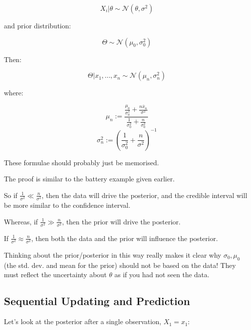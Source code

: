 \documentclass[a4paper]{article}
\begin{document}
                \[
                    X_i | \theta \sim \mathcal{N}(\theta, \sigma^2)
                \]

                and prior distribution:

                \[
                    \Theta \sim \mathcal{N}(\mu_0, \sigma_0^2)
                \]

                Then:

                \[
                    \Theta | x_1, ..., x_n \sim \mathcal{N}(\mu_n, \sigma^2_n)
                \]

                where:

                \[
                    \mu_n := \frac{\frac{\mu_0}{\sigma_0^2} + \frac{n\bar x_n}
                    {\sigma^2}}{\frac{1}{\sigma_0^2} + \frac{n}{\sigma_0^2}}
                \]
                \[
                    \sigma_n^2 := \left(\frac{1}{\sigma_0^2} +
                    \frac{n}{\sigma^2}\right)^{-1}
                \]

                These formulae should probably just be memorised.

                The proof is similar to the battery example given earlier.

                So if $\frac{1}{\sigma^2} \ll \frac{n}{\sigma^2}$, then the
                data will drive the posterior, and the credible interval will be
                more similar to the confidence interval.

                Whereas, if $\frac{1}{\sigma^2} \gg \frac{n}{\sigma^2}$, then
                the prior will drive the posterior.

                If $\frac{1}{\sigma^2} \approx \frac{n}{\sigma^2}$, then both
                the data and the prior will influence the posterior.

                \begin{warn}
                    Thinking about the prior/posterior in this way really makes
                    it clear why $\sigma_0, \mu_0$ (the std. dev. and mean for
                    the prior) should not be based on the data! They must
                    reflect the uncertainty about $\theta$ as if you had not
                    seen the data.
                \end{warn}

        \subsection{Sequential Updating and Prediction}
            Let's look at the posterior after a single observation, $X_1 = x_1$:
\end{document}

